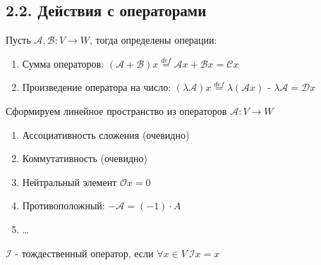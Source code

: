 \documentclass[12pt]{article}
\begin{document}
    \subsection[p2\_2]{2.2. Действия с операторами}

    \Def Пусть $\mathcal{A}, \mathcal{B}: V \rightarrow W$, тогда определены операции:

    \begin{enumerate}
        \item Сумма операторов: $(\mathcal{A} + \mathcal{B})x \stackrel{def}{=} \mathcal{A}x + \mathcal{B}x = \mathcal{C}x$
        \item Произведение оператора на число: $(\lambda\mathcal{A})x \stackrel{def}{=} \lambda(\mathcal{A}x)$ - $\lambda\mathcal{A} = \mathcal{D}x$
    \end{enumerate}

    \Nota Сформируем линейное пространство из операторов $\mathcal{A}: V \rightarrow W$

    \begin{enumerate}
        \item Ассоциативность сложения (очевидно)
        \item Коммутативность (очевидно)
        \item Нейтральный элемент $\mathcal{O}x = 0$
        \item Противоположный: $-\mathcal{A} = (-1) \cdot A$
        \item \dots \Lab
    \end{enumerate}

    \Def $\mathcal{I}$ - тождественный оператор, если $\forall x \in V \ \mathcal{I}x = x$
\end{document}
